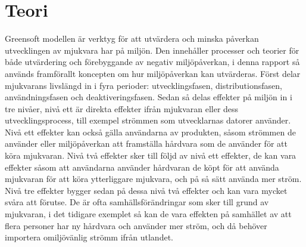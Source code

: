 \section{Teori}
\label{sec:joel_a-theory}

Greensoft modellen är verktyg för att utvärdera och minska påverkan utvecklingen av mjukvara har på miljön. Den innehåller processer och teorier för både utvärdering och förebyggande av negativ miljöpåverkan, i denna rapport så används framförallt koncepten om hur miljöpåverkan kan utvärderas. Först delar mjukvarans livslängd in i fyra perioder: utvecklingsfasen, distributionsfasen, användningsfasen och deaktiveringsfasen. Sedan så delas effekter på miljön in i tre nivåer, nivå ett är direkta effekter ifrån mjukvaran eller dess utvecklingsprocess, till exempel strömmen som utvecklarnas datorer använder. Nivå ett effekter kan också gälla användarna av produkten, såsom strömmen de använder eller miljöpåverkan att framställa hårdvara som de använder för att köra mjukvaran. Nivå två effekter sker till följd av nivå ett effekter, de kan vara effekter såsom att användarna använder hårdvaran de köpt för att använda mjukvaran för att köra ytterliggare mjukvara, och på så sätt använda mer ström. Nivå tre effekter bygger sedan på dessa nivå två effekter och kan vara mycket svåra att förutse. De är ofta samhällsförändringar som sker till grund av mjukvaran, i det tidigare exemplet så kan de vara effekten på samhället av att flera personer har ny hårdvara och använder mer ström, och då behöver importera omiljövänlig strömm ifrån utlandet. 
